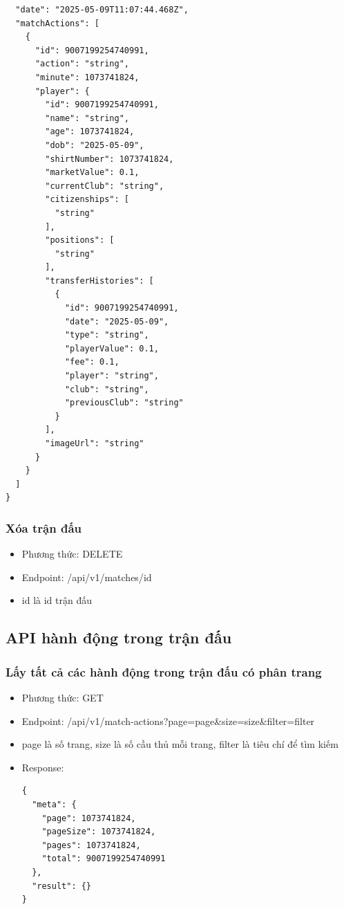 \documentclass[../BTL.tex]{subfiles}
\begin{document}
\begin{itemize}
\begin{verbatim}
  "date": "2025-05-09T11:07:44.468Z",
  "matchActions": [
    {
      "id": 9007199254740991,
      "action": "string",
      "minute": 1073741824,
      "player": {
        "id": 9007199254740991,
        "name": "string",
        "age": 1073741824,
        "dob": "2025-05-09",
        "shirtNumber": 1073741824,
        "marketValue": 0.1,
        "currentClub": "string",
        "citizenships": [
          "string"
        ],
        "positions": [
          "string"
        ],
        "transferHistories": [
          {
            "id": 9007199254740991,
            "date": "2025-05-09",
            "type": "string",
            "playerValue": 0.1,
            "fee": 0.1,
            "player": "string",
            "club": "string",
            "previousClub": "string"
          }
        ],
        "imageUrl": "string"
      }
    }
  ]
}
        \end{verbatim}
\end{itemize}

\subsubsection{ Xóa trận đấu}
\begin{itemize}
    \item Phương thức: DELETE
    \item Endpoint: /api/v1/matches/{id}
    \item {id} là id trận đấu
\end{itemize}

\subsection{ API hành động trong trận đấu}
\subsubsection{ Lấy tất cả các hành động trong trận đấu có phân trang}
\begin{itemize}
    \item Phương thức: GET
    \item Endpoint: /api/v1/match-actions?page={page}\&size={size}\&filter={filter}
    \item {page} là số trang, {size} là số cầu thủ mỗi trang, {filter} là tiêu chí để tìm kiếm
    \item Response:
        \begin{verbatim}
{
  "meta": {
    "page": 1073741824,
    "pageSize": 1073741824,
    "pages": 1073741824,
    "total": 9007199254740991
  },
  "result": {}
}
        \end{verbatim}
\end{itemize}
\end{document}
